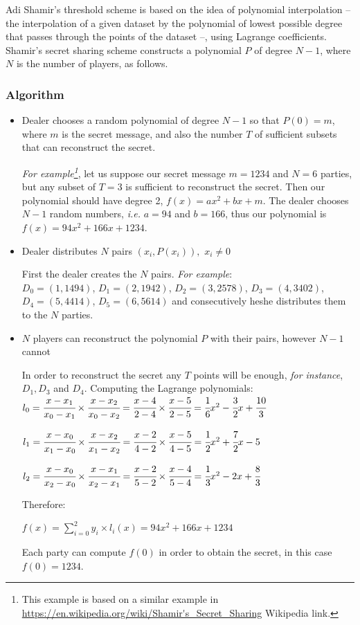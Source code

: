 Adi Shamir's threshold scheme is based on the idea of polynomial interpolation -- the interpolation of a given dataset by the polynomial of lowest possible degree that passes through the points of the dataset --, using Lagrange coefficients.
Shamir's secret sharing scheme constructs a polynomial $P$ of degree $N-1$, where $N$ is the number of players, as follows.


\subsubsection{Algorithm}\label{sss:shamir-algorithm}
\begin{itemize}
  \item Dealer chooses a random polynomial of degree $N - 1$ so that $P(0) = m$, where $m$ is the secret message, and also the number $T$ of sufficient subsets that can reconstruct the secret.

  \textit{For example\footnote{This example is based on a similar example in \url{https://en.wikipedia.org/wiki/Shamir's_Secret_Sharing} Wikipedia link.}}, let us suppose our secret message $m = 1234$ and $N = 6$ parties, but any subset of $T = 3$ is sufficient to reconstruct the secret.
  Then our polynomial should have degree 2, $f(x) = ax^2 + bx + m$.
  The dealer chooses $N - 1$ random numbers, \textit{i.e.} $a = 94$ and $b = 166$, thus our polynomial is $f(x) = 94x^2 + 166x + 1234$.


  \item Dealer distributes $N$ pairs $(x_i , P(x_i)),$ $x_i \neq 0$

  First the dealer creates the $N$ pairs.
  \textit{For example}:\\
  $D_0 = (1, 1494)$, $D_1 = (2, 1942)$, $D_2 = (3, 2578)$, $D_3 = (4, 3402)$, $D_4 = (5, 4414)$, $D_5 = (6, 5614)$ and consecutively he\myslash she distributes them to the $N$ parties.


  \item $N$ players can reconstruct the polynomial $P$ with their pairs, however $N - 1$ cannot

  In order to reconstruct the secret any $T$ points will be enough, \textit{for instance}, $D_1, D_3$ and $D_4$.
  Computing the Lagrange polynomials:\\
  $l_0 = \cfrac{x - x_1}{x_0 - x_1} \times \cfrac{x - x_2}{x_0 - x_2} = \cfrac{x - 4}{2 - 4} \times \cfrac{x - 5}{2 - 5} = \cfrac{1}{6}x^2 - \cfrac{3}{2}x + \cfrac{10}{3}$

  $l_1 = \cfrac{x - x_0}{x_1 - x_0} \times \cfrac{x - x_2}{x_1 - x_2} = \cfrac{x - 2}{4 - 2} \times \cfrac{x - 5}{4 - 5} = \cfrac{1}{2}x^2 + \cfrac{7}{2}x - 5$

  $l_2 = \cfrac{x - x_0}{x_2 - x_0} \times \cfrac{x - x_1}{x_2 - x_1} = \cfrac{x - 2}{5 - 2} \times \cfrac{x - 4}{5 - 4} = \cfrac{1}{3}x^2 - 2x + \cfrac{8}{3}$

  Therefore:

  $f(x) = \sum_{i=0}^{2} y_i \times l_i(x) = 94x^2 + 166x + 1234$

  Each party can compute $f(0)$ in order to obtain the secret, in this case $f(0) = 1234$.
\end{itemize}

